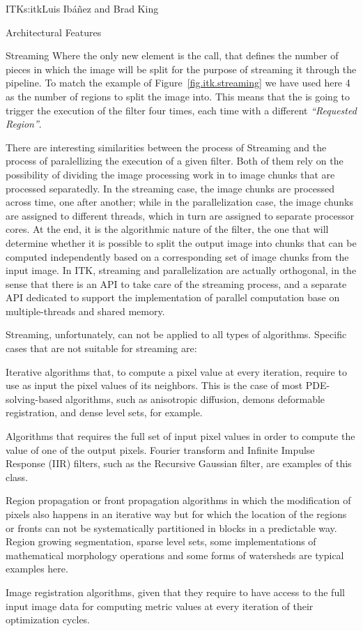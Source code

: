 \begin{aosachapter}{ITK}{s:itk}{Luis Ib\'{a}\~{n}ez and Brad King}
\begin{aosasect1}{Architectural Features}
\begin{aosasect2}{Streaming}
Where the only new element is the  call,
that defines the number of pieces in which the image will be split for the
purpose of streaming it through the pipeline. To match the example of
Figure~\ref{fig.itk.streaming} we have used here 4 as the number of regions to
split the image into. This means that the  is going to trigger the
execution of the  filter four times, each time with a different
\emph{``Requested Region''}.

There are interesting similarities between the process of Streaming
and the process of paralellizing the execution of a given filter. Both
of them rely on the possibility of dividing the image processing work
in to image chunks that are processed separatedly. In the streaming
case, the image chunks are processed across time, one after another;
while in the parallelization case, the image chunks are assigned to
different threads, which in turn are assigned to separate processor
cores. At the end, it is the algorithmic nature of the filter, the
one that will determine whether it is possible to split the output
image into chunks that can be computed independently based on a
corresponding set of image chunks from the input image. In ITK,
streaming and parallelization are actually orthogonal, in the sense
that there is an API to take care of the streaming process, and a
separate API dedicated to support the implementation of parallel
computation base on multiple-threads and shared memory.

Streaming, unfortunately, can not be applied to all types of algorithms. Specific
cases that are not suitable for streaming are:

\begin{aosaitemize}
\item Iterative algorithms that, to compute a pixel value at every iteration,
require to use as input the pixel values of its neighbors. This is the case of
most PDE-solving-based algorithms, such as anisotropic diffusion, demons
deformable registration, and dense level sets, for example.
\item Algorithms that requires the full set of input pixel values in order to
compute the value of one of the output pixels. Fourier transform and Infinite
Impulse Response (IIR) filters, such as the Recursive Gaussian filter, are
examples of this class.
\item Region propagation or front propagation algorithms in which the
modification of pixels also happens in an iterative way but for which the
location of the regions or fronts can not be systematically partitioned in
blocks in a predictable way. Region growing segmentation, sparse level sets,
some implementations of mathematical morphology operations and some forms of
watersheds are typical examples here.
\item Image registration algorithms, given that they require to have access to
the full input image data for computing metric values at every iteration of
their optimization cycles.
\end{aosaitemize}


\end{aosasect2}
\end{aosasect1}
\end{aosachapter}
